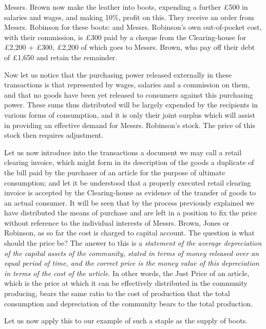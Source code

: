 \documentclass{book}
\begin{document}
Messrs. Brown now make the leather into boots, expending a further £500 in salaries and wages, and making 10\%, profit on this. They receive an order from Messrs. Robinson for these boots: and Messrs. Robinson’s own out-of-pocket cost, with their commission, is £300 paid by a cheque from the Clearing-house for £2,200 + £300, £2,200 of which goes to Messrs. Brown, who pay off their debt of £1,650 and retain the remainder.

Now let us notice that the purchasing power released externally in these transactions is that represented by wages, salaries and a commission on them, and that no goods have been yet released to consumers against this purchasing power. These sums thus distributed will be largely expended by the recipients in various forms of consumption, and it is only their joint surplus which will assist in providing an effective demand for Messrs. Robinson’s stock. The price of this stock then requires adjustment.

Let us now introduce into the transactions a document we may call a retail clearing invoice, which might form in its description of the goods a duplicate of the bill paid by the purchaser of an article for the purpose of ultimate consumption; and let it be understood that a properly executed retail clearing invoice is accepted by the Clearing-house as evidence of the transfer of goods to an actual consumer. It will be seen that by the process previously explained we have distributed the means of purchase and are left in a position to fix the price without reference to the individual interests of Messrs. Brown, Jones or Robinson, as so far the cost is charged to capital account. The question is what should the price be? The answer to this is a \emph{statement of the average depreciation of the capital assets of the community, stated in terms of money released over an equal period of time, and the correct price is the money value of this depreciation in terms of the cost of the article}. In other words, the Just Price of an article, which is the price at which it can be effectively distributed in the community producing, bears the same ratio to the cost of production that the total consumption and depreciation of the community bears to the total production.

Let us now apply this to our example of such a staple as the supply of boots.
\end{document}
